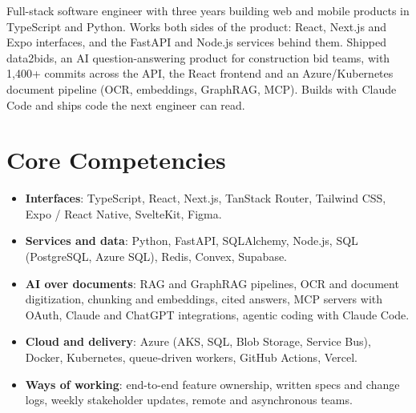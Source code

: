 \documentclass[11pt,a4paper,sans]{moderncv}
\begin{document}
\makecvtitle


\vspace{6pt}
\small{Full-stack software engineer with three years building web and mobile products in TypeScript and Python. Works both sides of the product: React, Next.js and Expo interfaces, and the FastAPI and Node.js services behind them. Shipped data2bids, an AI question-answering product for construction bid teams, with 1,400+ commits across the API, the React frontend and an Azure/Kubernetes document pipeline (OCR, embeddings, GraphRAG, MCP). Builds with Claude Code and ships code the next engineer can read.}


\section{Core Competencies}
\vspace{1pt}
\begin{itemize}

\item \textbf{Interfaces}: TypeScript, React, Next.js, TanStack Router, Tailwind CSS, Expo / React Native, SvelteKit, Figma.

\item \textbf{Services and data}: Python, FastAPI, SQLAlchemy, Node.js, SQL (PostgreSQL, Azure SQL), Redis, Convex, Supabase.

\item \textbf{AI over documents}: RAG and GraphRAG pipelines, OCR and document digitization, chunking and embeddings, cited answers, MCP servers with OAuth, Claude and ChatGPT integrations, agentic coding with Claude Code.

\item \textbf{Cloud and delivery}: Azure (AKS, SQL, Blob Storage, Service Bus), Docker, Kubernetes, queue-driven workers, GitHub Actions, Vercel.

\item \textbf{Ways of working}: end-to-end feature ownership, written specs and change logs, weekly stakeholder updates, remote and asynchronous teams.

\end{itemize}
\end{document}
